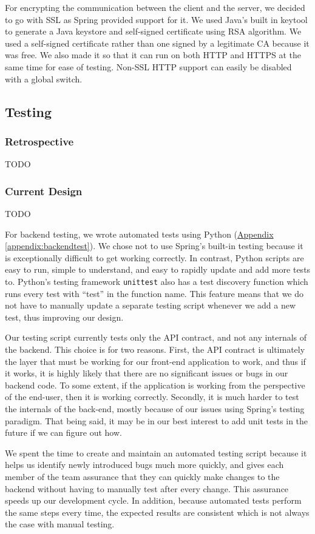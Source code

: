 \documentclass[12pt]{article}
\begin{document}
For encrypting the communication between the client and the server, we decided to go with SSL as Spring provided support for it. We used Java's built in keytool to generate a Java keystore and self-signed certificate using RSA algorithm. We used a self-signed certificate rather than one signed by a legitimate CA because it was free. We also made it so that it can run on both HTTP and HTTPS at the same time for ease of testing. Non-SSL HTTP support can easily be disabled with a global switch.


\subsection{Testing}
\subsubsection{Retrospective}
TODO
\subsubsection{Current Design}
TODO

For backend testing, we wrote automated tests using Python (\hyperref[appendix:backendtest]{Appendix \ref{appendix:backendtest}}). We chose not to use Spring's built-in testing because it is exceptionally difficult to get working correctly. In contrast, Python scripts are easy to run, simple to understand, and easy to rapidly update and add more tests to. Python's testing framework \texttt{unittest} also has a test discovery function which runs every test with ``test'' in the function name. This feature means that we do not have to manually update a separate testing script whenever we add a new test, thus improving our design.

Our testing script currently tests only the API contract, and not any internals of the backend. This choice is for two reasons. First, the API contract is ultimately the layer that must be working for our front-end application to work, and thus if it works, it is highly likely that there are no significant issues or bugs in our backend code. To some extent, if the application is working from the perspective of the end-user, then it is working correctly. Secondly, it is much harder to test the internals of the back-end, mostly because of our issues using Spring's testing paradigm. That being said, it may be in our best interest to add unit tests in the future if we can figure out how. 

We spent the time to create and maintain an automated testing script because it helps us identify newly introduced bugs much more quickly, and gives each member of the team assurance that they can quickly make changes to the backend without having to manually test after every change. This assurance speeds up our development cycle. In addition, because automated tests perform the same steps every time, the expected results are consistent which is not always the case with manual testing.
\end{document}
